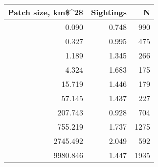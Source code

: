 \begin{tabular}{rrr}
\toprule
 Patch size, km\$\textasciicircum 2\$ &  Sightings &    N \\
\midrule
              0.090 &      0.748 &  990 \\
              0.327 &      0.995 &  475 \\
              1.189 &      1.345 &  266 \\
              4.324 &      1.683 &  175 \\
             15.719 &      1.446 &  179 \\
             57.145 &      1.437 &  227 \\
            207.743 &      0.928 &  704 \\
            755.219 &      1.737 & 1275 \\
           2745.492 &      2.049 &  592 \\
           9980.846 &      1.447 & 1935 \\
\bottomrule
\end{tabular}
